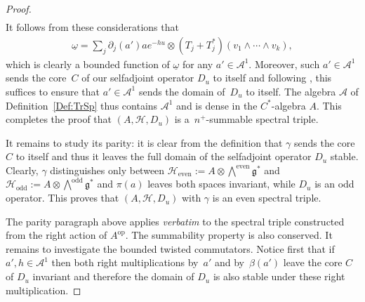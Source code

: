 \documentclass[11pt]{article}
\newcommand{\Aa}{\mathcal{A}}
\newcommand{\Core}{C}
\newcommand{\Hh}{\mathscr{H}}
\newcommand{\LieG}{\mathfrak{g}}
\newcommand{\omegat}{\underline{\omega}}
\numberwithin{equation}{section}
\begin{document}
\begin{proof}
\begin{gather*}
\end{gather*}
It follows from these considerations that
\begin{gather*}
[D_u, a'] \omegat = \sum_j \partial_j(a') a e^{-h u} \otimes (T_j + T_j^*)( v_1 \wedge \cdots \wedge v_k),
\end{gather*}
which is clearly a bounded function of $\omegat$ for any $a' \in \Aa^1$. Moreover, such $a' \in \Aa^1$ sends the core~$\Core$ of our selfadjoint operator $D_u$ to itself and following \cite[Proposition~A.1, p.~293]{TrSpPiCr-Paterson}, this suf\/f\/ices to ensure that $a' \in \Aa^1$ sends the domain of~$D_u$ to itself. The algebra $\Aa$ of Def\/inition~\ref{Def:TrSp} thus contains $\Aa^1$ and is dense in the $C^*$-algebra $A$. This completes the proof that $(A, \Hh, D_u)$ is a~$n^+$-summable spectral triple.

It remains to study its parity: it is clear from the def\/inition that $\gamma$ sends the core $\Core$ to itself and thus it leaves the full domain of the selfadjoint operator $D_u$ stable. Clearly, $\gamma$ distinguishes only between $\Hh_\text{even} := A \otimes \bigwedge^\text{even} \LieG^*$ and $\Hh_\text{odd} := A \otimes \bigwedge^\text{odd} \LieG^*$ and $\pi(a)$ leaves both spaces invariant, while $D_u$ is an odd operator. This proves that $(A, \Hh, D_u)$ with $\gamma$ is an even spectral triple.

The parity paragraph above applies \textit{verbatim} to the spectral triple constructed from the right action of $A^\text{op}$. The summability property is also conserved. It remains to investigate the bounded twisted commutators. Notice f\/irst that if $a', h \in \Aa^1$ then both right multiplications by~$a'$ and by~$\beta(a')$ leave the core $\Core$ of $D_u$ invariant and therefore the domain of $D_u$ is also stable under these right multiplication.


\end{proof}
\end{document}
